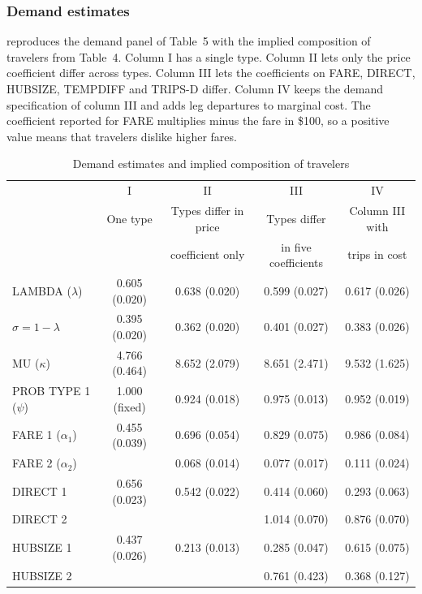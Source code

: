 \subsubsection{Demand estimates}

 reproduces the demand panel of Table~5 with the implied composition of travelers
from Table~4. Column I has a single type. Column II lets only the price coefficient differ across types.
Column III lets the coefficients on FARE, DIRECT, HUBSIZE, TEMPDIFF and TRIPS-D differ. Column IV keeps the
demand specification of column III and adds leg departures to marginal cost. The coefficient reported for
FARE multiplies minus the fare in \$100, so a positive value means that travelers dislike higher fares.

\begin{table}[htbp]
\centering
\begin{threeparttable}
\caption{Demand estimates and implied composition of travelers}
\label{tab:09-bcs-demand}
\footnotesize
\setlength{\tabcolsep}{4pt}
\begin{tabular}{@{}lcccc@{}}
\toprule
 & I & II & III & IV \\
 & One type & Types differ in price & Types differ & Column III with \\
 & & coefficient only & in five coefficients & trips in cost \\
\midrule
LAMBDA ($\lambda$) & 0.605 (0.020) & 0.638 (0.020) & 0.599 (0.027) & 0.617 (0.026) \\
$\sigma=1-\lambda$ & 0.395 (0.020) & 0.362 (0.020) & 0.401 (0.027) & 0.383 (0.026) \\
MU ($\kappa$) & 4.766 (0.464) & 8.652 (2.079) & 8.651 (2.471) & 9.532 (1.625) \\
PROB TYPE 1 ($\psi$) & 1.000 (fixed) & 0.924 (0.018) & 0.975 (0.013) & 0.952 (0.019) \\
\addlinespace
FARE 1 ($\alpha_1$) & 0.455 (0.039) & 0.696 (0.054) & 0.829 (0.075) & 0.986 (0.084) \\
FARE 2 ($\alpha_2$) & & 0.068 (0.014) & 0.077 (0.017) & 0.111 (0.024) \\
DIRECT 1 & 0.656 (0.023) & 0.542 (0.022) & 0.414 (0.060) & 0.293 (0.063) \\
DIRECT 2 & & & 1.014 (0.070) & 0.876 (0.070) \\
HUBSIZE 1 & 0.437 (0.026) & 0.213 (0.013) & 0.285 (0.047) & 0.615 (0.075) \\
HUBSIZE 2 & & & 0.761 (0.423) & 0.368 (0.127) \\

\end{tabular}
\end{threeparttable}
\end{table}
